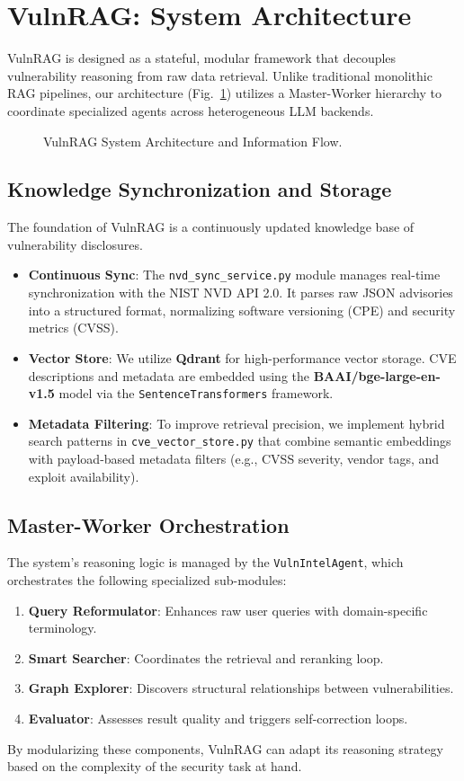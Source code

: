 \section{VulnRAG: System Architecture}
\label{sec:design}

VulnRAG is designed as a stateful, modular framework that decouples vulnerability reasoning from raw data retrieval. Unlike traditional monolithic RAG pipelines, our architecture (Fig.~\ref{fig:arch}) utilizes a Master-Worker hierarchy to coordinate specialized agents across heterogeneous LLM backends.

\begin{figure}[htbp]
    \centering
    
    \caption{VulnRAG System Architecture and Information Flow.}
    \label{fig:arch}
\end{figure}

\subsection{Knowledge Synchronization and Storage}
The foundation of VulnRAG is a continuously updated knowledge base of vulnerability disclosures. 
\begin{itemize}
    \item \textbf{Continuous Sync}: The \texttt{nvd\_sync\_service.py} module manages real-time synchronization with the NIST NVD API 2.0. It parses raw JSON advisories into a structured format, normalizing software versioning (CPE) and security metrics (CVSS).
    \item \textbf{Vector Store}: We utilize \textbf{Qdrant} for high-performance vector storage. CVE descriptions and metadata are embedded using the \textbf{BAAI/bge-large-en-v1.5} model via the \texttt{SentenceTransformers} framework.
    \item \textbf{Metadata Filtering}: To improve retrieval precision, we implement hybrid search patterns in \texttt{cve\_vector\_store.py} that combine semantic embeddings with payload-based metadata filters (e.g., CVSS severity, vendor tags, and exploit availability).
\end{itemize}

\subsection{Master-Worker Orchestration}
The system's reasoning logic is managed by the \texttt{VulnIntelAgent}, which orchestrates the following specialized sub-modules:
\begin{enumerate}
    \item \textbf{Query Reformulator}: Enhances raw user queries with domain-specific terminology.
    \item \textbf{Smart Searcher}: Coordinates the retrieval and reranking loop.
    \item \textbf{Graph Explorer}: Discovers structural relationships between vulnerabilities.
    \item \textbf{Evaluator}: Assesses result quality and triggers self-correction loops.
\end{enumerate}

By modularizing these components, VulnRAG can adapt its reasoning strategy based on the complexity of the security task at hand.
